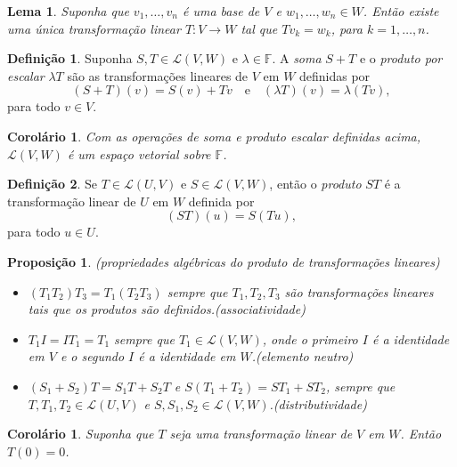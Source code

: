 \documentclass[12pt]{article}
\theoremstyle{plain}
\newtheorem{prop}[thm]{Proposição}
\newtheorem{lem}[thm]{Lema}
\newtheorem{cor}[thm]{Corolário}
\theoremstyle{definition}
\newtheorem{defn}{Definição}[section]
\theoremstyle{remark}
\begin{document}
\begin{lem}
    Suponha que \(v_1,\ldots,v_n\) é uma base de \(V\) e \(w_1,\ldots,w_n \in W\). Então existe uma única transformação linear \(T: V \to W\) tal que \(Tv_k = w_k\), para \(k = 1, \ldots, n\).
\end{lem}

\begin{defn}
    Suponha \(S, T \in \mathcal{L}(V, W)\) e \(\lambda \in \mathbb{F}\). A \emph{soma} \(S + T\) e o \emph{produto por escalar} \(\lambda T\) são as transformações lineares de \(V\) em \(W\) definidas por
    \[
        (S + T)(v) = S(v) + Tv \quad \text{e} \quad (\lambda T)(v) = \lambda (Tv),
    \]
    \noindent para todo \(v \in V\).
\end{defn}

\begin{cor}
    Com as operações de soma e produto escalar definidas acima, \(\mathcal{L}(V, W)\) é um espaço vetorial sobre \(\mathbb{F}\).
\end{cor}

\begin{defn}
    Se \(T \in \mathcal{L}(U, V)\) e \(S \in \mathcal{L}(V, W)\), então o \emph{produto} \(ST\) é a transformação linear de \(U\) em \(W\) definida por
    \[
        (ST)(u) = S(Tu),
    \]
    \noindent para todo \(u \in U\).
\end{defn}

\begin{prop} (propriedades algébricas do produto de transformações lineares)
    \begin{itemize}
        \item \(\left(T_1 T_2\right)T_3 = T_1\left(T_2T_3\right)\) sempre que \(T_1, T_2, T_3\) são transformações lineares tais que os produtos são definidos.\hfill\emph{(associatividade)}
        \item \(T_1I = IT_1 = T_1\) sempre que \(T_1 \in \mathcal{L}(V, W)\), onde o primeiro \(I\) é a identidade em \(V\) e o segundo \(I\) é a identidade em \(W\).\hfill\emph{(elemento neutro)}
        \item \(\left(S_1 + S_2\right)T = S_1T + S_2T\) e \(S\left(T_1 + T_2\right) = ST_1 + ST_2\), sempre que \(T, T_1, T_2 \in \mathcal{L}(U, V)\) e \(S, S_1, S_2 \in \mathcal{L}(V, W)\).\hfill\emph{(distributividade)}
    \end{itemize}
\end{prop}

\begin{cor}
    Suponha que \(T\) seja uma transformação linear de \(V\) em \(W\). Então \(T(0) = 0\).
\end{cor}
\end{document}
